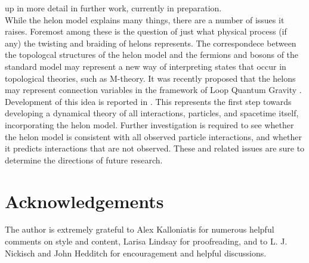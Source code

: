 \documentclass[twocolumn,showpacs,preprintnumbers,amsmath,amssymb]{revtex4}
\begin{document}
up in more detail in further work, currently in preparation.\\     
While the helon model explains many things, there are a number of issues it raises. 
Foremost among these is the question of just what physical process (if any) the 
twisting and braiding of helons represents. The correspondece between the topologcal 
structures of the helon model and the fermions and bosons of the standard model may 
represent a new way of interpreting states that occur in topological theories, such as 
M-theory. It was recently proposed that the helons may represent connection variables 
in the framework of Loop Quantum Gravity \cite{Smolin}. Development
of this idea is reported in \cite{SundanceFotiniLee}. This represents the first step 
towards developing a dynamical theory of all interactions, particles, and spacetime 
itself, incorporating the helon model. Further investigation is required to see whether 
the helon model is consistent with all observed particle interactions, and whether it 
predicts interactions that are not observed. These and related issues are sure to 
determine the directions of future research. 

\section{Acknowledgements}
The author is extremely grateful to Alex Kalloniatis for numerous helpful comments 
on style and content, Larisa Lindsay for proofreading, and to L. J. Nickisch and 
John Hedditch for encouragement and helpful discussions.
  
\end{document}
